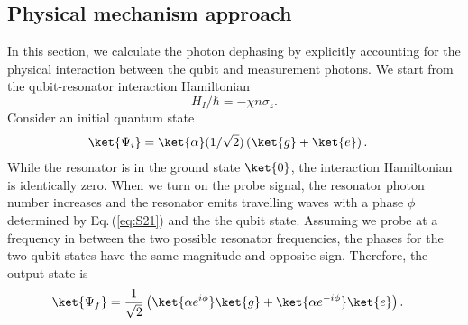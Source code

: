 \subsection{Physical mechanism approach}

In this section, we calculate the photon dephasing by explicitly accounting for the physical interaction between the qubit and measurement photons.
We start from the qubit-resonator interaction Hamiltonian \begin{equation}
H_I/\hbar = -\chi n \sigma_z . \end{equation}
Consider an initial quantum state \begin{align}
\ket{\Psi_i}
&= \ket{\alpha}(1/\sqrt{2})\left( \ket{g} + \ket{e} \right) . \end{align}
While the resonator is in the ground state $\ket{0}$, the interaction Hamiltonian is identically zero.
When we turn on the probe signal, the resonator photon number increases and the resonator emits travelling waves with a phase $\phi$ determined by Eq.\,(\ref{eq:S21}) and the the qubit state.
Assuming we probe at a frequency in between the two possible resonator frequencies, the phases for the two qubit states have the same magnitude and opposite sign.
Therefore, the output state is \begin{align}
\ket{\Psi_f} &= \frac{1}{\sqrt{2}} \left( \ket{\alpha e^{i \phi}}\ket{g} + \ket{\alpha e^{-i \phi}}\ket{e} \right) . \label{eq:sec:measurementInducedDephasing:dispersedState} \end{align}


